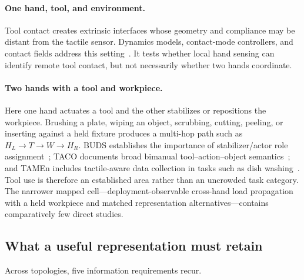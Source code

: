 \paragraph{One hand, tool, and environment.}
Tool contact creates extrinsic interfaces whose geometry and compliance may be
distant from the tactile sensor. Dynamics models, contact-mode controllers, and
contact fields address this setting~\cite{shirai2023tactiletool,vandermerwe2022compliant,oller2024extrinsic,higuera2023ncf}.
It tests whether local hand sensing can identify remote tool contact, but not
necessarily whether two hands coordinate.

\paragraph{Two hands with a tool and workpiece.}
Here one hand actuates a tool and the other stabilizes or repositions the
workpiece. Brushing a plate, wiping an object, scrubbing, cutting, peeling, or
inserting against a held fixture produces a multi-hop path such as
$H_L\!\rightarrow T\!\rightarrow W\!\rightarrow H_R$. BUDS establishes the
importance of stabilizer/actor role assignment~\cite{grannen2023stabilize}; TACO
documents broad bimanual tool--action--object semantics~\cite{liu2024taco}; and
TAMEn includes tactile-aware data collection in tasks such as dish
washing~\cite{wu2026tamen}. Tool use is therefore an established area rather than
an uncrowded task category. The narrower mapped cell---deployment-observable
cross-hand load propagation with a held workpiece and matched representation
alternatives---contains comparatively few direct studies.

\subsection{What a useful representation must retain}

Across topologies, five information requirements recur.

